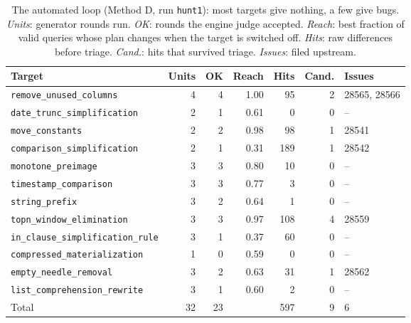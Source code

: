 \begin{table}[t]
\caption{The automated loop (Method D, run \texttt{hunt1}): most targets give nothing, a few give bugs. \emph{Units}: generator rounds run. \emph{OK}: rounds the engine judge accepted. \emph{Reach}: best fraction of valid queries whose plan changes when the target is switched off. \emph{Hits}: raw differences before triage. \emph{Cand.}: hits that survived triage. \emph{Issues}: filed upstream.}
\label{tab:hunt1}
\footnotesize\centering
\begin{tabular}{lrrrrrl}
\toprule
Target & Units & OK & Reach & Hits & Cand. & Issues \\
\midrule
\texttt{remove\_unused\_columns} & 4 & 4 & 1.00 & 95 & 2 & 28565, 28566 \\
\texttt{date\_trunc\_simplification} & 2 & 1 & 0.61 & 0 & 0 & -- \\
\texttt{move\_constants} & 2 & 2 & 0.98 & 98 & 1 & 28541 \\
\texttt{comparison\_simplification} & 2 & 1 & 0.31 & 189 & 1 & 28542 \\
\texttt{monotone\_preimage} & 3 & 3 & 0.80 & 10 & 0 & -- \\
\texttt{timestamp\_comparison} & 3 & 3 & 0.77 & 3 & 0 & -- \\
\texttt{string\_prefix} & 3 & 2 & 0.64 & 1 & 0 & -- \\
\texttt{topn\_window\_elimination} & 3 & 3 & 0.97 & 108 & 4 & 28559 \\
\texttt{in\_clause\_simplification\_rule} & 3 & 1 & 0.37 & 60 & 0 & -- \\
\texttt{compressed\_materialization} & 1 & 0 & 0.59 & 0 & 0 & -- \\
\texttt{empty\_needle\_removal} & 3 & 2 & 0.63 & 31 & 1 & 28562 \\
\texttt{list\_comprehension\_rewrite} & 3 & 1 & 0.60 & 2 & 0 & -- \\
\midrule
Total & 32 & 23 & & 597 & 9 & 6 \\
\bottomrule
\end{tabular}
\end{table}
